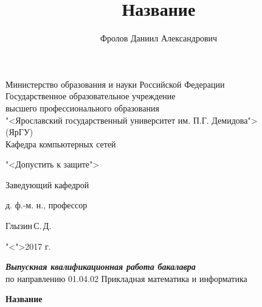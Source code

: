 \documentclass[a4paper, 14pt]{extarticle}
\title{Название}
\author{Фролов Даниил Александрович}
\theoremstyle{definition}
\begin{document}
\setcounter{tocdepth}{3}

\makeatletter
\AtEndDocument{%
	\addtocounter{totfigures}{\value{figure}}%
	\addtocounter{tottables}{\value{table}}%
	\addtocounter{totsections}{\value{section}}%
	\immediate\write\@mainaux{%
		\string\gdef\string\totfig{\number\value{totfigures}}%
		\string\gdef\string\tottab{\number\value{tottables}}%
		\string\gdef\string\totsections{\number\value{totsections}}%
	}%
}
\makeatother


{
\thispagestyle{empty}

\begin{center}
	
	Министерство образования и науки Российской Федерации\\[0.3cm]
	Государственное образовательное учреждение\\
	высшего профессионального образования\\
	"<Ярославский государственный университет им. П.Г. Демидова">\\
	(ЯрГУ)\\[0.3cm]
	
	Кафедра компьютерных сетей
	
	\bigskip
	
	\hspace{15em}"<Допустить к защите">
	
	\begin{flushright}
		Заведующий кафедрой\par
		д. ф.-м. н., профессор\par
		\underline{\hspace{3.2cm}}Глызин\,С.\,Д.\par
		"<\underline{\hspace{0.5cm}}">\underline{\hspace{3.4cm}}2017 г.\par
	\end{flushright}
	
	\bigskip
	
	{\textbf
		{\textit
			{Выпускная квалификационная работа бакалавра}
		}
	}
	\\
	по направлению 01.04.02 Прикладная математика и информатика
	
	\bigskip
	
	{\bf
		Название 
	}
\end{center}

\medskip

}
\end{document}
